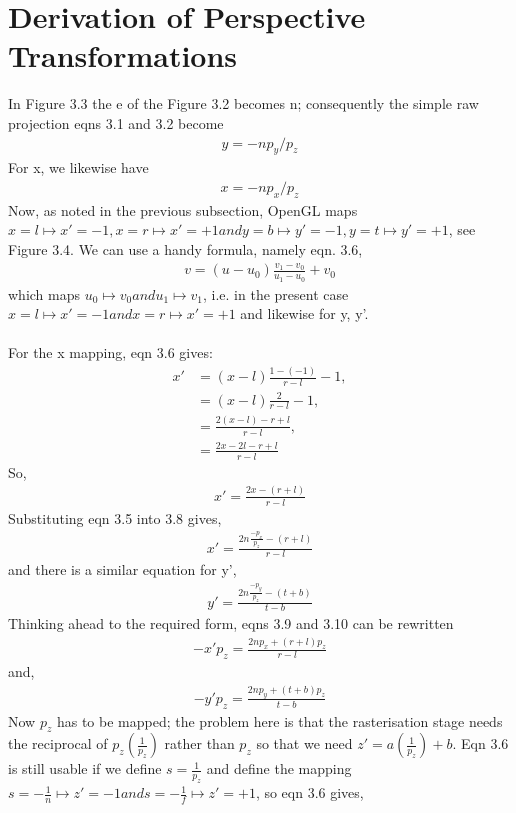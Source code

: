 \documentclass[
11pt, %
english, %
singlespacing, %
headsepline, %
]{MastersDoctoralThesis} %
\begin{document}
\section{Derivation of Perspective Transformations}
In Figure 3.3 the e of the Figure 3.2 becomes n; consequently the simple raw projection eqns 3.1 and 3.2 become
\begin{align*} y = -n p_y/p_z \tag{3.4} \end{align*}
For x, we likewise have
\begin{align*} x = -n p_x/p_z \tag{3.5} \end{align*}
Now, as noted in the previous subsection, OpenGL maps $x = l \mapsto x' = -1, x = r \mapsto x'= +1 and y = b \mapsto y' = -1, y = t \mapsto y' = +1$, see Figure 3.4. We can use a handy formula, namely eqn. 3.6,
\begin{align*} v = (u - u_0) \frac{v_1 - v_0}{u_1 - u_0} + v_0 \tag{3.6} \end{align*}
which maps $ u_0 \mapsto v_0 and u_1 \mapsto v_1 $, i.e. in the present case $ x = l \mapsto x'= -1 and x = r \mapsto x'= +1$ and likewise for y, y'. \\ \\
For the x mapping, eqn 3.6 gives:
\begin{align*} x'&= (x-l)\frac{1-(-1)}{r-l} - 1, \tag{3.7} \\
&= (x-l)\frac{2}{r-l} -1,\\
&= \frac{2(x-l)-r+l}{r-l},\\
&= \frac{2x-2l-r+l}{r-l}
\end{align*}
So,
\begin{align*} x'= \frac{2x - (r+l)}{r-l} \tag{3.8} \end{align*}
Substituting eqn 3.5 into 3.8 gives,
\begin{align*} x'= \frac{2n \frac{-p_x}{p_z}- (r+l)}{r-l} \tag{3.9} \end{align*}
and there is a similar equation for y',
\begin{align*} y'= \frac{2n \frac{-p_y}{p_z}- (t+b)}{t-b} \tag{3.10} \end{align*}
Thinking ahead to the required form, eqns 3.9 and 3.10 can be rewritten
\begin{align*} -x'p_z = \frac{2np_x + (r+l)p_z}{r-l} \tag{3.11} \end{align*}
and,
\begin{align*} -y'p_z= \frac{2np_y+(t+b)p_z}{t-b} \tag{3.12} \end{align*}
Now $p_z$  has to be mapped; the problem here is that the rasterisation stage needs the reciprocal of $p_z (\frac{1}{p_z})$ rather than $p_z$ so that we need $z'= a(\frac{1}{p_z}) + b$. Eqn 3.6 is still usable if we define $s = \frac{1}{p_z}$ and define the mapping $s = -\frac{1}{n} \mapsto z'= -1 and s  = -\frac{1}{f} \mapsto z'= +1$, so eqn 3.6 gives,
\end{document}

